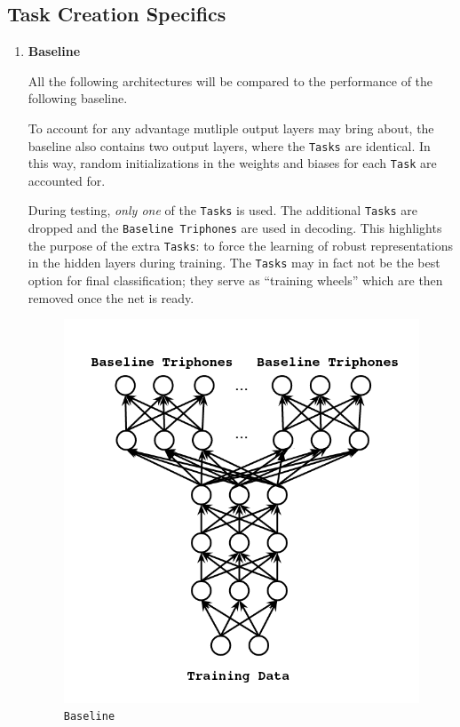 \documentclass[10pt,a4paper]{article}
\begin{document}
\newpage

\subsection{Task Creation Specifics}


\begin{enumerate}

\item \textbf{Baseline}

All the following architectures will be compared to the performance of the following baseline.

To account for any advantage mutliple output layers may bring about, the baseline also contains two output layers, where the \texttt{Tasks} are identical. In this way, random initializations in the weights and biases for each \texttt{Task} are accounted for.

During testing, \textit{only one} of the \texttt{Tasks} is used. The additional \texttt{Tasks} are dropped and the \texttt{Baseline Triphones} are used in decoding. This highlights the purpose of the extra \texttt{Tasks}: to force the learning of robust representations in the hidden layers during training. The \texttt{Tasks} may in fact not be the best option for final classification; they serve as ``training wheels'' which are then removed once the net is ready. 

\begin{figure}[!htb]
  \centering
{}
  \includegraphics[width=\linewidth]{figs/mtl-arch-baseline.png}
  \caption{\texttt{Baseline}}
\endminipage\hfill
\end{figure}




\end{enumerate}
\end{document}
